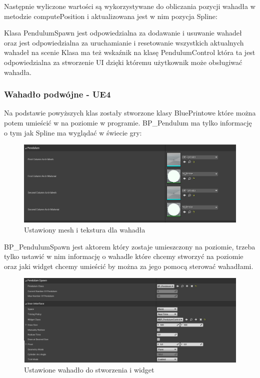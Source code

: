 \documentclass[a4paper,12pt,reqno]{article}
\begin{document}



Następnie wyliczone wartości są wykorzystywane do obliczania pozycji wahadła w metodzie computePosition i aktualizowana jest w nim pozycja Spline:



Klasa PendulumSpawn jest odpowiedzialna za dodawanie i usuwanie wahadeł oraz jest odpowiedzialna za uruchamianie i resetowanie wszystkich aktualnych wahadeł na scenie
Klasa ma też wskaźnik na klasę PendulumControl która ta jest odpowiedzialna za stworzenie UI dzięki któremu użytkownik może obsługiwać wahadła.

\subsubsection{Wahadło podwójne - UE4}
Na podstawie powyższych klas zostały stworzone klasy BluePrintowe które można potem umieścić w na poziomie w programie. BP\_Pendulum ma tylko informację o tym jak Spline ma wyglądać w świecie gry:

\begin{figure}[H]%
\centering
\includegraphics[width=0.7\columnwidth]{graphics/pendulum/PendulumBP.png}
\caption{Ustawiony mesh i tekstura dla wahadła 
\label{BPExample}}%
%
\qquad
\end{figure}  

BP\_PendulumSpawn jest aktorem który zostaje umieszczony na poziomie, trzeba tylko ustawić w nim informację o wahadle które chcemy stworzyć na poziomie oraz jaki widget chcemy umieścić by można za jego pomocą sterować wahadłami.

\begin{figure}[H]%
\centering
\includegraphics[width=0.7\columnwidth]{graphics/pendulum/PendulumSpawnerBP.png}
\caption{Ustawione wahadło do stworzenia i widget 
\label{BPExample}}%
%
\qquad
\end{figure}  
\end{document}
